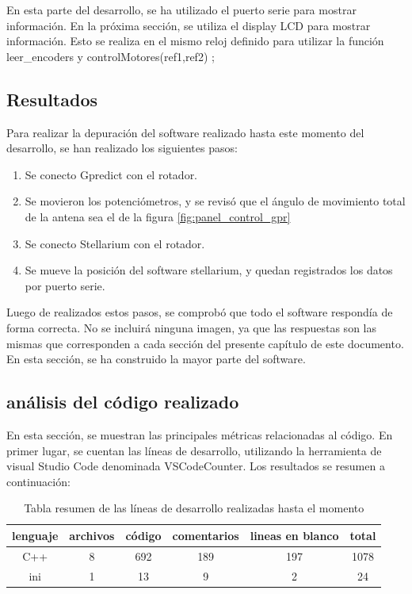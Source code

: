 En esta parte del desarrollo, se ha utilizado el puerto serie para mostrar información. En la próxima sección, se utiliza el display LCD para mostrar información. Esto se realiza en el mismo reloj definido para utilizar la función leer\_encoders y controlMotores(ref1,ref2) ; 

\subsection{Resultados}
Para realizar la depuración del software realizado hasta este momento del desarrollo, se han realizado los siguientes pasos: 
\begin{enumerate}
	\item Se conecto Gpredict con el rotador. 
	\item Se movieron los potenciómetros, y se revisó que el ángulo de movimiento total de la antena sea el de la figura \ref{fig:panel_control_gpr}
	\item Se conecto Stellarium con el rotador.
	\item Se mueve la posición del software stellarium, y quedan registrados los datos por puerto serie.
\end{enumerate}


Luego de realizados estos pasos, se comprobó que todo el software respondía de forma correcta. No se incluirá ninguna imagen, ya que las respuestas son las mismas que corresponden a cada sección del presente capítulo de este documento. En esta sección, se ha construido la mayor parte del software. 


\subsection{análisis del código realizado}

En esta sección, se muestran las principales métricas relacionadas al código. 
En primer lugar, se cuentan las líneas de desarrollo, utilizando la herramienta de visual Studio Code denominada VSCodeCounter. Los resultados se resumen a continuación: 
\begin{table}[ht]
	\centering
	\begin{tabular}{|c|c|c|c|c|c|}
		\hline 
		lenguaje& archivos & código & comentarios & lineas en blanco & total \\ 
		\hline 
		C++ & 8 &692 &189 &197 & 1078 \\
		\hline 
		ini &1 &13 &9 &2&24\\
		\hline
	\end{tabular}
\caption{Tabla resumen de las líneas de desarrollo realizadas hasta el momento}
\end{table}

